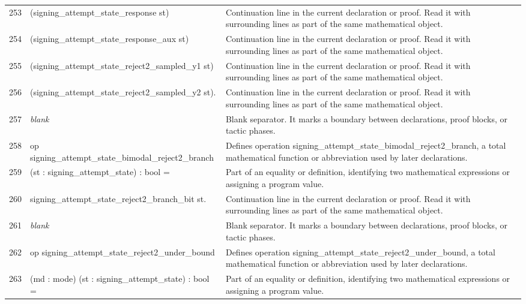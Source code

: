 \documentclass[10pt]{article}
\begin{document}
\begin{longtable}{r L{0.53\textwidth} L{0.37\textwidth}}
253 & {\ttfamily\scriptsize     (signing\_attempt\_state\_response st)} & Continuation line in the current declaration or proof.  Read it with surrounding lines as part of the same mathematical object. \\
254 & {\ttfamily\scriptsize     (signing\_attempt\_state\_response\_aux st)} & Continuation line in the current declaration or proof.  Read it with surrounding lines as part of the same mathematical object. \\
255 & {\ttfamily\scriptsize     (signing\_attempt\_state\_reject2\_sampled\_y1 st)} & Continuation line in the current declaration or proof.  Read it with surrounding lines as part of the same mathematical object. \\
256 & {\ttfamily\scriptsize     (signing\_attempt\_state\_reject2\_sampled\_y2 st).} & Continuation line in the current declaration or proof.  Read it with surrounding lines as part of the same mathematical object. \\
257 & {\ttfamily\scriptsize \emph{blank}} & Blank separator.  It marks a boundary between declarations, proof blocks, or tactic phases. \\
258 & {\ttfamily\scriptsize op signing\_attempt\_state\_bimodal\_reject2\_branch} & Defines operation signing\_attempt\_state\_bimodal\_reject2\_branch, a total mathematical function or abbreviation used by later declarations. \\
259 & {\ttfamily\scriptsize    (st : signing\_attempt\_state) : bool =} & Part of an equality or definition, identifying two mathematical expressions or assigning a program value. \\
260 & {\ttfamily\scriptsize   signing\_attempt\_state\_reject2\_branch\_bit st.} & Continuation line in the current declaration or proof.  Read it with surrounding lines as part of the same mathematical object. \\
261 & {\ttfamily\scriptsize \emph{blank}} & Blank separator.  It marks a boundary between declarations, proof blocks, or tactic phases. \\
262 & {\ttfamily\scriptsize op signing\_attempt\_state\_reject2\_under\_bound} & Defines operation signing\_attempt\_state\_reject2\_under\_bound, a total mathematical function or abbreviation used by later declarations. \\
263 & {\ttfamily\scriptsize    (md : mode) (st : signing\_attempt\_state) : bool =} & Part of an equality or definition, identifying two mathematical expressions or assigning a program value. \\

\end{longtable}
\end{document}
